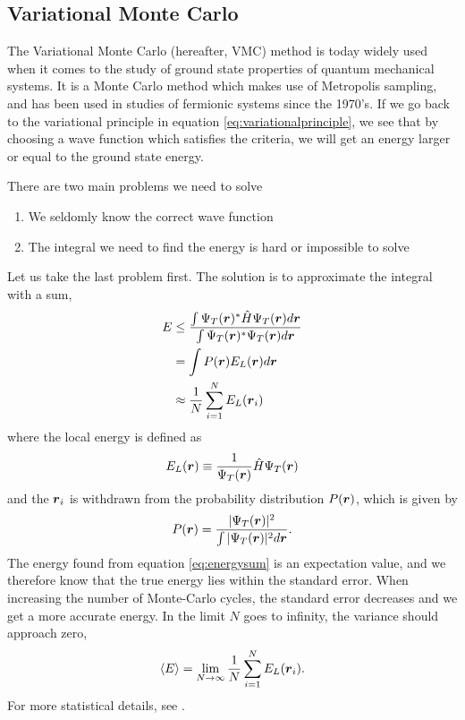 \subsection{Variational Monte Carlo} \label{subsec:vmc}
The Variational Monte Carlo (hereafter, VMC) method is today widely used when it comes to the study of ground state properties of quantum mechanical systems. It is a Monte Carlo method which makes use of Metropolis sampling, and has been used in studies of fermionic systems since the 1970's. \cite{deb2014} If we go back to the variational principle in equation \eqref{eq:variationalprinciple}, we see that by choosing a wave function which satisfies the criteria, we will get an energy larger or equal to the ground state energy. \bigskip

There are two main problems we need to solve
\begin{enumerate}
	\item We seldomly know the correct wave function
	\item The integral we need to find the energy is hard or impossible to solve
\end{enumerate}
Let us take the last problem first. The solution is to approximate the integral with a sum,
\begin{align}
E &\leq \frac{\int\Psi_T(\boldsymbol{{r}})^*\hat{H}\Psi_T(\boldsymbol{{r}}) d\boldsymbol{{r}}}{\int\Psi_T(\boldsymbol{{r}})^*\Psi_T(\boldsymbol{{r}}) d\boldsymbol{{r}}} \notag\\
& = \int P(\boldsymbol{{r}}) E_L(\boldsymbol{{r}}) d\boldsymbol{{r}} \notag\\
& \approx \frac{1}{N}\sum_{i=1}^NE_L(\boldsymbol{{r}}_i) \label{eq:energysum}
\end{align}
where the local energy is defined as
\begin{equation}
E_L(\boldsymbol{{r}})\equiv\frac{1}{\Psi_T(\boldsymbol{{r}})}\hat{H}\Psi_T(\boldsymbol{{r}})
\label{eq:local energy}
\end{equation}
and the $\boldsymbol{{r}}_i$ is withdrawn from the probability distribution $P(\boldsymbol{{r}})$, which is given by
\begin{equation}
P(\boldsymbol{{r}})=\frac{|\Psi_T(\boldsymbol{{r}})|^2}{\int|\Psi_T(\boldsymbol{{r}})|^2d\boldsymbol{{r}}}.
\end{equation}
The energy found from equation \eqref{eq:energysum} is an expectation value, and we therefore know that the true energy lies within the standard error. When increasing the number of Monte-Carlo cycles, the standard error decreases and we get a more accurate energy. In the limit $N$ goes to infinity, the variance should approach zero,
\begin{equation}
\langle E\rangle=\lim_{N\to\infty} \frac{1}{N}\sum_{i=1}^NE_L(\boldsymbol{{r}}_i).
\end{equation}
For more statistical details, see \cite{deb2014}. 

